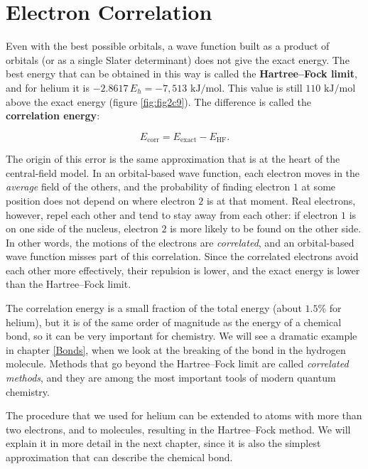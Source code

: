 \documentclass[
  english,
  9pt,
]{extbook}
\theoremstyle{definition}
\theoremstyle{definition}
\theoremstyle{definition}
\theoremstyle{definition}
\theoremstyle{remark}
\begin{document}
\section{Electron Correlation}\label{electron-correlation}

Even with the best possible orbitals, a wave function built as a product of orbitals (or as a single Slater determinant) does not give the exact energy. The best energy that can be obtained in this way is called the \textbf{Hartree--Fock limit}, and for helium it is \(-2.8617\,E_h=-7{,}513 \text{ kJ/mol}\). This value is still \(110 \text{ kJ/mol}\) above the exact energy (figure \ref{fig:fig2c9}). The difference is called the \textbf{correlation energy}:

\begin{equation}
E_\text{corr} = E_\text{exact} - E_\text{HF}.
\label{eq:ecorr}
\end{equation}

The origin of this error is the same approximation that is at the heart of the central-field model. In an orbital-based wave function, each electron moves in the \emph{average} field of the others, and the probability of finding electron \(1\) at some position does not depend on where electron \(2\) is at that moment. Real electrons, however, repel each other and tend to stay away from each other: if electron \(1\) is on one side of the nucleus, electron \(2\) is more likely to be found on the other side. In other words, the motions of the electrons are \emph{correlated}, and an orbital-based wave function misses part of this correlation. Since the correlated electrons avoid each other more effectively, their repulsion is lower, and the exact energy is lower than the Hartree--Fock limit.

The correlation energy is a small fraction of the total energy (about \(1.5\%\) for helium), but it is of the same order of magnitude as the energy of a chemical bond, so it can be very important for chemistry. We will see a dramatic example in chapter \ref{Bonds}, when we look at the breaking of the bond in the hydrogen molecule. Methods that go beyond the Hartree--Fock limit are called \emph{correlated methods}, and they are among the most important tools of modern quantum chemistry.

The procedure that we used for helium can be extended to atoms with more than two electrons, and to molecules, resulting in the Hartree--Fock method. We will explain it in more detail in the next chapter, since it is also the simplest approximation that can describe the chemical bond.
\end{document}
